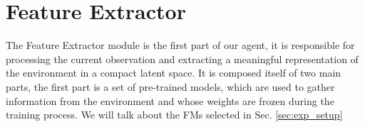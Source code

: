 





\section{Feature Extractor} \label{sec:feature_extractor}
The Feature Extractor module is the first part of our agent, it is responsible for processing the current observation and extracting a meaningful representation of the environment in a compact latent space.
It is composed itself of two main parts, the first part is a set of pre-trained models, which are used to gather information from the environment and whose weights are frozen during the training process.
We will talk about the FMs selected in Sec. \ref{sec:exp_setup}

